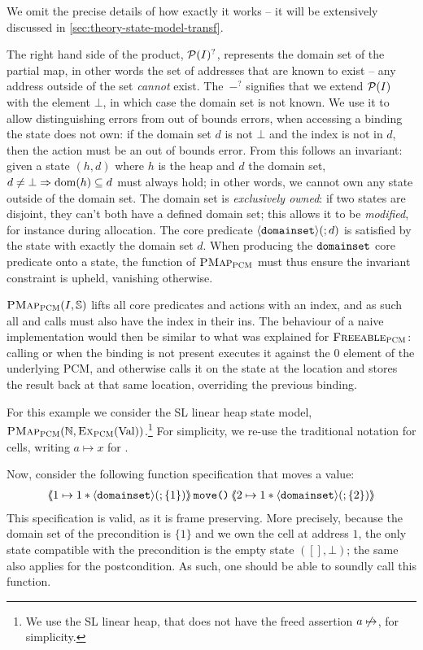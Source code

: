 We omit the precise details of how exactly it works -- it will be extensively discussed in \cref{sec:theory-state-model-transf}. 

The right hand side of the product, ${\cal P}(I)^?$, represents the domain set of the partial map, in other words the set of addresses that are known to exist -- any address outside of the set \emph{cannot} exist. The~$-^?$ signifies that we extend ${\cal P}(I)$ with the element $\bot$, in which case the domain set is not known. We use it to allow distinguishing \Miss{} errors from out of bounds errors, when accessing a binding the state does not own: if the domain set $d$ is not $\bot$ and the index is not in $d$, then the action must be an out of bounds error. From this follows an invariant: given a state $(h,d)$ where $h$ is the heap and $d$ the domain set, $d\neq\bot\Rightarrow\operatorname{dom}(h)\subseteq d$ must always hold; in other words, we cannot own any state outside of the domain set. The domain set is \emph{exclusively owned}: if two \PMap{} states are disjoint, they can't both have a defined domain set; this allows it to be \emph{modified}, for instance during allocation. The core predicate $\left<\texttt{domainset}\right>\!(;d)$ is satisfied by the state with exactly the domain set $d$. When producing the $\texttt{domainset}$ core predicate onto a state, the \produce{} function of $\textsc{PMap}_{\textsc{PCM}}$ must thus ensure the invariant constraint is upheld, vanishing otherwise.

$\textsc{PMap}_{\textsc{PCM}}(I,\mathbb S)$ lifts all core predicates and actions with an index, and as such all \consume{} and \produce{} calls must also have the index in their ins. The behaviour of a naive implementation would then be similar to what was explained for $\textsc{Freeable}_{\textsc{PCM}}$: calling \consume{} or \produce{} when the binding is not present executes it against the $0$ element of the underlying PCM, and otherwise calls it on the state at the location and stores the result back at that same location, overriding the previous binding.

For this example we consider the SL linear heap state model, $\textsc{PMap}_{\textsc{PCM}}(\mathbb N, \textsc{Ex}_{\textsc{PCM}}(\text{Val}))$.\footnote{We use the SL linear heap, that does not have the freed assertion $a\not\mapsto$, for simplicity.} For simplicity, we re-use the traditional notation for cells, writing $a \mapsto x$ for .

Now, consider the following function specification that moves a value:
\begin{align*}
\left<\mkern-5mu\left<1\mapsto 1 * \left<\texttt{domainset}\right>\!(;\{1\})\right>\mkern-5mu\right>\texttt{move()}\left<\mkern-5mu\left<2\mapsto 1 * \left<\texttt{domainset}\right>\!(;\{2\})\right>\mkern-5mu\right>
\end{align*}
This specification is valid, as it is frame preserving. More precisely, because the domain set of the precondition is $\{1\}$ and we own the cell at address $1$, the only state compatible with the precondition is the empty state $([], \bot)$; the same also applies for the postcondition. As such, one should be able to soundly call this function.

